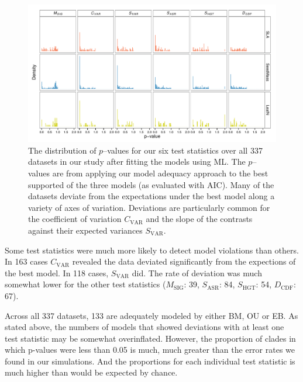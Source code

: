 \begin{figure}[p]
  \centering
  \includegraphics[width=\textwidth]{figs/pval-hist-ml}
  \caption[Distribution of $p$-values for test statistics (ML)]{The distribution of $p$--values for our six test statistics over all 337 datasets in our study after fitting the models using ML. The $p$--values are from applying our model adequacy approach to the best supported of the three models (as evaluated with AIC). Many of the datasets deviate from the expectations under the best model along a variety of axes of variation. Deviations are particularly common for the coefficient of variation $C_{\text{VAR}}$ and the slope of the contrasts against their expected variances $S_{\text{VAR}}$.}
  \label{fig:pvalues}
\end{figure}

Some test statistics were much more likely to detect model violations than others. In 163 cases $C_{\text{VAR}}$ revealed the data deviated significantly from the expections of the best model. In 118 cases, $S_{\text{VAR}}$ did. The rate of deviation was much somewhat lower for the other test statistics ($M_{\text{SIG}}$: 39, $S_{\text{ASR}}$: 84, $S_{\text{HGT}}$: 54, $D_{\text{CDF}}$: 67).

Across all 337 datasets, 133 are adequately modeled by either BM, OU or EB. As stated above, the numbers of models that showed deviations with at least one test statistic may be somewhat overinflated. However, the proportion of clades in which p-values were less than 0.05 is much, much greater than the error rates we found in our simulations. And the proportions for each individual test statistic is much higher than would be expected by chance. 

